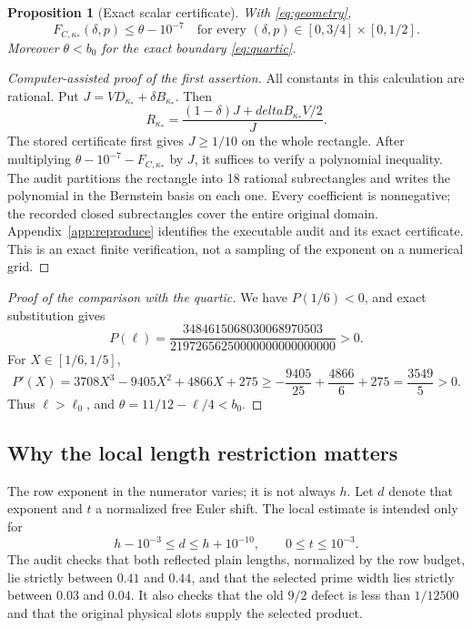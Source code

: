 \documentclass[11pt]{article}
\newtheorem{proposition}{Proposition}[section]
\theoremstyle{definition}
\begin{document}
\begin{proposition}[Exact scalar certificate]\label{prop:certificate}
With \eqref{eq:geometry},
\[
 F_{C,\kappa_*}(\delta,p)\le\theta-10^{-7}
 \quad\text{for every }(\delta,p)\in[0,3/4]\times[0,1/2].
\]
Moreover $\theta<b_0$ for the exact boundary \eqref{eq:quartic}.
\end{proposition}
\begin{proof}[Computer-assisted proof of the first assertion]
All constants in this calculation are rational. Put
$J=VD_{\kappa_*}+\delta B_{\kappa_*}$. Then
\[
 R_{\kappa_*}=\frac{(1-\delta)J+delta B_{\kappa_*}V/2}{J}.
\]
The stored certificate first gives $J\ge1/10$ on the whole rectangle.
After multiplying $\theta-10^{-7}-F_{C,\kappa_*}$ by $J$, it suffices
to verify a polynomial inequality. The audit partitions the rectangle
into 18 rational subrectangles and writes the polynomial in the
Bernstein basis on each one. Every coefficient is nonnegative; the
recorded closed subrectangles cover the entire original domain.
Appendix~\ref{app:reproduce} identifies the executable audit and its
exact certificate. This is an exact finite verification, not a sampling
of the exponent on a numerical grid.
\end{proof}
\begin{proof}[Proof of the comparison with the quartic]
We have $P(1/6)<0$, and exact substitution gives
\[
 P(\ell)=\frac{3484615068030068970503}
                    {21972656250000000000000000}>0.
\]
For $X\in[1/6,1/5]$,
\[
 P'(X)=3708X^3-9405X^2+4866X+275
 \ge-\frac{9405}{25}+\frac{4866}{6}+275
 =\frac{3549}{5}>0.
\]
Thus $\ell>\ell_0$, and $\theta=11/12-\ell/4<b_0$.
\end{proof}

\subsection{Why the local length restriction matters}
The row exponent in the numerator varies; it is not always $h$.
Let $d$ denote that exponent and $t$ a normalized free Euler shift.
The local estimate is intended only for
\begin{equation}\label{eq:applicationwindow}
 h-10^{-3}\le d\le h+10^{-10},\qquad 0\le t\le10^{-3}.
\end{equation}
The audit checks that both reflected plain lengths, normalized by the
row budget, lie strictly between $0.41$ and $0.44$, and that the selected
prime width lies strictly between $0.03$ and $0.04$. It also checks
that the old $9/2$ defect is less than $1/12500$ and that the original
physical slots supply the selected product.
\end{document}
